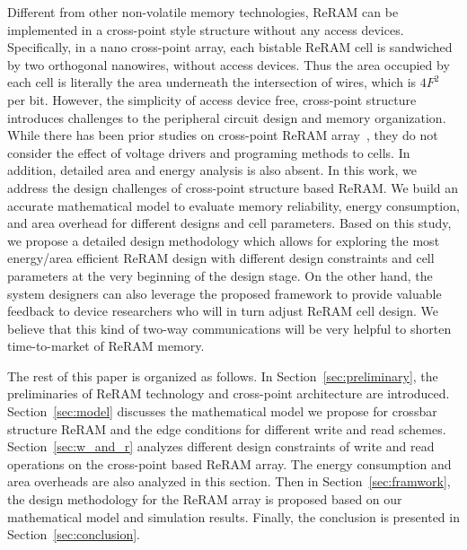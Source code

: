 Different from other non-volatile memory technologies, ReRAM can be implemented in a cross-point style structure without any access devices. Specifically, in a nano cross-point array, each bistable ReRAM cell is sandwiched by two orthogonal nanowires, without access devices. Thus the area occupied by each cell is literally the area underneath the intersection of wires, which is $4F^2$ per bit. 
However, the simplicity of access device free, cross-point structure introduces challenges to the peripheral circuit design and memory organization.
While there has been prior studies on cross-point ReRAM array~\cite{crossbar_NANO2002_Ziegler,crossbar_NANO08_Flocke,crossbar_TED_2010,crossbar_NANO2003_Ziegler}, they do not consider the effect of voltage drivers and programing methods to cells.
In addition, detailed area and energy analysis is also absent. 
In this work, we address the design challenges of cross-point structure based ReRAM. We build an accurate mathematical model to evaluate memory reliability, energy consumption, and area overhead for different designs and cell parameters. Based on this study, we propose a detailed design methodology which allows for exploring the most energy/area efficient ReRAM design with different design constraints and cell parameters at the very beginning of the design stage. On the other hand, the system designers can also leverage the proposed framework to provide valuable feedback to device researchers who will in turn adjust ReRAM cell design. We believe that this kind of two-way communications will be very helpful to shorten time-to-market of ReRAM memory.

The rest of this paper is organized as follows. In
Section~\ref{sec:preliminary}, the preliminaries of ReRAM technology and cross-point architecture are introduced. Section~\ref{sec:model} discusses the mathematical model we propose for crossbar structure ReRAM and the edge conditions for different write and read schemes. Section~\ref{sec:w_and_r} analyzes different design constraints of write and read operations on the cross-point based ReRAM array. The energy consumption and area overheads are also analyzed in this section. Then in Section~\ref{sec:framwork}, the design methodology for the ReRAM array is proposed based on our mathematical model and simulation results. Finally, the conclusion is presented in Section~\ref{sec:conclusion}. 
